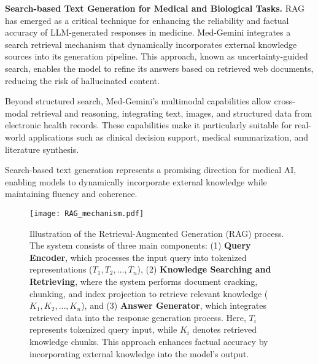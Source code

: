 \textbf{Search-based Text Generation for Medical and Biological Tasks.}
RAG has emerged as a critical technique for enhancing the reliability and factual accuracy of LLM-generated responses in medicine. Med-Gemini integrates a search retrieval mechanism that dynamically incorporates external knowledge sources into its generation pipeline. This approach, known as uncertainty-guided search, enables the model to refine its answers based on retrieved web documents, reducing the risk of hallucinated content.

Beyond structured search, Med-Gemini’s multimodal capabilities allow cross-modal retrieval and reasoning, integrating text, images, and structured data from electronic health records. These capabilities make it particularly suitable for real-world applications such as clinical decision support, medical summarization, and literature synthesis.

Search-based text generation represents a promising direction for medical AI, enabling models to dynamically incorporate external knowledge while maintaining fluency and coherence.

\begin{figure}
\vskip 0.2in
\begin{center}
\centerline{\texttt{[image: RAG\_mechanism.pdf]}}
\caption{Illustration of the Retrieval-Augmented Generation (RAG) process. The system consists of three main components: (1) \textbf{Query Encoder}, which processes the input query into tokenized representations (\(T_1, T_2, \dots, T_n \)), (2) \textbf{Knowledge Searching and Retrieving}, where the system performs document cracking, chunking, and index projection to retrieve relevant knowledge (\(K_1, K_2, \dots, K_n\)), and (3) \textbf{Answer Generator}, which integrates retrieved data into the response generation process. Here, \(T_i\) represents tokenized query input, while \(K_i\) denotes retrieved knowledge chunks. This approach enhances factual accuracy by incorporating external knowledge into the model’s output.}
\label{RAG_mechanism}
\end{center}
\vskip -0.2in
\end{figure}